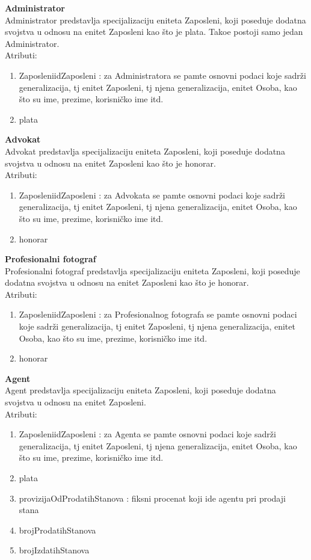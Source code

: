 \documentclass[20pt]{article}
\begin{document}
{\bfseries Administrator}\\
Administrator predstavlja specijalizaciju eniteta Zaposleni, koji poseduje dodatna svojstva u odnosu na enitet Zaposleni kao \v {s}to je plata. Tako\dj e postoji samo jedan Administrator.\\
\indent Atributi:
\begin{enumerate}
        \item  ZaposleniidZaposleni : za Administratora se pamte osnovni podaci koje sadr\v {z}i generalizacija, tj enitet Zaposleni, tj njena generalizacija, enitet Osoba, kao \v {s}to su ime, prezime, korisni\v {c}ko ime itd.
        \item  plata
\end{enumerate}
{\bfseries Advokat}\\
Advokat predstavlja specijalizaciju eniteta Zaposleni, koji poseduje dodatna svojstva u odnosu na enitet Zaposleni kao \v {s}to je honorar.\\
\indent Atributi:
\begin{enumerate}
        \item  ZaposleniidZaposleni : za Advokata se pamte osnovni podaci koje sadr\v {z}i generalizacija, tj enitet Zaposleni, tj njena generalizacija, enitet Osoba, kao \v {s}to su ime, prezime, korisni\v {c}ko ime itd.
        \item  honorar
\end{enumerate}
{\bfseries Profesionalni fotograf}\\
Profesionalni fotograf predstavlja specijalizaciju eniteta Zaposleni, koji poseduje dodatna svojstva u odnosu na enitet Zaposleni kao \v {s}to je honorar.\\
\indent Atributi:
\begin{enumerate}
        \item  ZaposleniidZaposleni : za Profesionalnog fotografa se pamte osnovni podaci koje sadr\v {z}i generalizacija, tj enitet Zaposleni, tj njena generalizacija, enitet Osoba, kao \v {s}to su ime, prezime, korisni\v {c}ko ime itd.
        \item  honorar
\end{enumerate}
{\bfseries Agent}\\
Agent predstavlja specijalizaciju eniteta Zaposleni, koji poseduje dodatna svojstva u odnosu na enitet Zaposleni.\\
\indent Atributi:
\begin{enumerate}
        \item  ZaposleniidZaposleni : za Agenta se pamte osnovni podaci koje sadr\v {z}i generalizacija, tj enitet Zaposleni, tj njena generalizacija, enitet Osoba, kao \v {s}to su ime, prezime, korisni\v {c}ko ime itd.
        \item  plata
        \item provizijaOdProdatihStanova : fiksni procenat koji ide agentu pri prodaji stana
        \item brojProdatihStanova
        \item brojIzdatihStanova
\end{enumerate}
\end{document}
